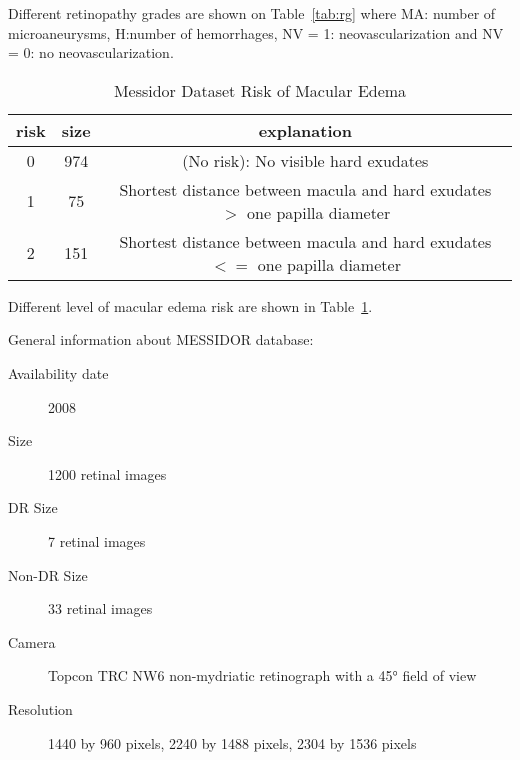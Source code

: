 Different retinopathy grades are shown on Table~\ref{tab:rg} where MA: number of microaneurysms, H:number of hemorrhages, NV = 1: neovascularization and NV = 0: no neovascularization. 

\begin{table}[t]
\centering
\caption{Messidor Dataset Risk of Macular Edema} \label{tab:ma}
\begin{tabular}{|c|c|c|} \hline
risk & size &  explanation \\ \hline
0 & 974 & (No risk): No visible hard exudates \\ \hline
1 & 75 & Shortest distance between macula and hard exudates $>$ one papilla diameter \\\hline
2 & 151 & Shortest distance between macula and hard exudates $<=$ one papilla diameter \\\hline
\end{tabular}
\end{table}

Different level of macular edema risk are shown in Table~\ref{tab:ma}.


General information about MESSIDOR database:

\begin{description}
    \item[Availability date] 2008
    \item[Size] 1200 retinal images
    \item[DR Size] 7 retinal images
    \item[Non-DR Size] 33 retinal images
    \item[Camera]  Topcon TRC NW6 non-mydriatic retinograph with a 45° field of view
    \item[Resolution] 1440 by 960 pixels, 2240 by 1488 pixels, 2304 by 1536 pixels
\end{description}


